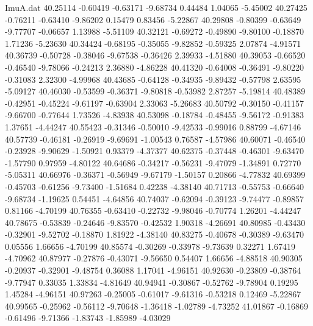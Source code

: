 \begin{filecontents}{ImuA.dat}
  40.25114   -0.60419   -0.63171   -9.68734    0.44484    1.04065   -5.45002
  40.27425   -0.76211   -0.63410   -9.86202    0.15479    0.83456   -5.22867
  40.29808   -0.80399   -0.63649   -9.77707   -0.06657    1.13988   -5.51109
  40.32121   -0.69272   -0.49890   -9.80100   -0.18870    1.71236   -5.23630
  40.34424   -0.68195   -0.35055   -9.82852   -0.59325    2.07874   -4.91571
  40.36739   -0.50728   -0.38046   -9.67538   -0.36426    2.39933   -4.51880
  40.39053   -0.66520   -0.46540   -9.78066   -0.24213    2.36880   -4.86228
  40.41320   -0.64008   -0.36491   -9.80220   -0.31083    2.32300   -4.99968
  40.43685   -0.64128   -0.34935   -9.89432   -0.57798    2.63595   -5.09127
  40.46030   -0.53599   -0.36371   -9.80818   -0.53982    2.87257   -5.19814
  40.48389   -0.42951   -0.45224   -9.61197   -0.63904    2.33063   -5.26683
  40.50792   -0.30150   -0.41157   -9.66700   -0.77644    1.73526   -4.83938
  40.53098   -0.18784   -0.48455   -9.56172   -0.91383    1.37651   -4.44247
  40.55423   -0.31346   -0.50010   -9.42533   -0.99016    0.88799   -4.67146
  40.57739   -0.46181   -0.26919   -9.69691   -1.00543    0.76587   -4.57986
  40.60071   -0.46540   -0.23928   -9.90629   -1.50921    0.93379   -4.37377
  40.62375   -0.37448   -0.46301   -9.63470   -1.57790    0.97959   -4.80122
  40.64686   -0.34217   -0.56231   -9.47079   -1.34891    0.72770   -5.05311
  40.66976   -0.36371   -0.56949   -9.67179   -1.50157    0.20866   -4.77832
  40.69399   -0.45703   -0.61256   -9.73400   -1.51684    0.42238   -4.38140
  40.71713   -0.55753   -0.66640   -9.68734   -1.19625    0.54451   -4.64856
  40.74037   -0.62094   -0.39123   -9.74477   -0.89857    0.81166   -4.70199
  40.76355   -0.63410   -0.22732   -9.98046   -0.70774    1.26201   -4.44247
  40.78675   -0.53839   -0.24646   -9.83570   -0.42532    1.90318   -4.26691
  40.80985   -0.43430   -0.32901   -9.52702   -0.18870    1.81922   -4.38140
  40.83275   -0.40678   -0.30389   -9.63470    0.05556    1.66656   -4.70199
  40.85574   -0.30269   -0.33978   -9.73639    0.32271    1.67419   -4.70962
  40.87977   -0.27876   -0.43071   -9.56650    0.54407    1.66656   -4.88518
  40.90305   -0.20937   -0.32901   -9.48754    0.36088    1.17041   -4.96151
  40.92630   -0.23809   -0.38764   -9.77947    0.33035    1.33834   -4.81649
  40.94941   -0.30867   -0.52762   -9.78904    0.19295    1.45284   -4.96151
  40.97263   -0.25005   -0.61017   -9.61316   -0.53218    0.12469   -5.22867
  40.99565   -0.25962   -0.56112   -9.70648   -1.36418   -1.02789   -4.73252
  41.01867   -0.16869   -0.61496   -9.71366   -1.83743   -1.85989   -4.03029

\end{filecontents}
